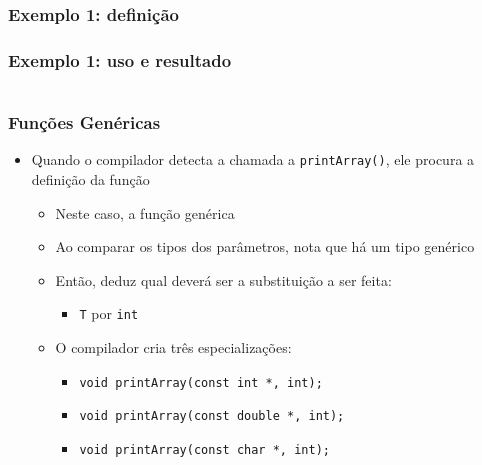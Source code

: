 \documentclass[aspectratio=169]{beamer}
\begin{document}
\begin{frame}[fragile]\frametitle{Exemplo 1: definição}

\end{frame}

\begin{frame}[fragile]\frametitle{Exemplo 1: uso e resultado}
\begin{columns}
\begin{column}{0.65\linewidth}

\end{column}
\begin{column}{0.35\linewidth}

\end{column}
\end{columns}
\end{frame}

\begin{frame}\frametitle{Funções Genéricas}
\begin{itemize}
	\item Quando o compilador detecta a chamada a \texttt{printArray()}, ele procura a definição da função
	\begin{itemize}
		\item Neste caso, a função genérica
		\item Ao comparar os tipos dos parâmetros, nota que há um tipo genérico
		\item Então, deduz qual deverá ser a substituição a ser feita:
		\begin{itemize}
			\item \texttt{T} por \texttt{int}
		\end{itemize}
		\item O compilador cria três especializações:
		\begin{itemize}
			\item \texttt{void printArray(const int *, int);}
			\item \texttt{void printArray(const double *, int);}
			\item \texttt{void printArray(const char *, int);}
		\end{itemize}
	\end{itemize}
\end{itemize}
\end{frame}
\end{document}
